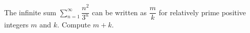 The infinite sum $\displaystyle\sum_{n=1}^{\infty}\dfrac{n^2}{3^n}$ can be written as $\dfrac mk$ for relatively prime positive integers $m$ and $k$. Compute $m+k$.
